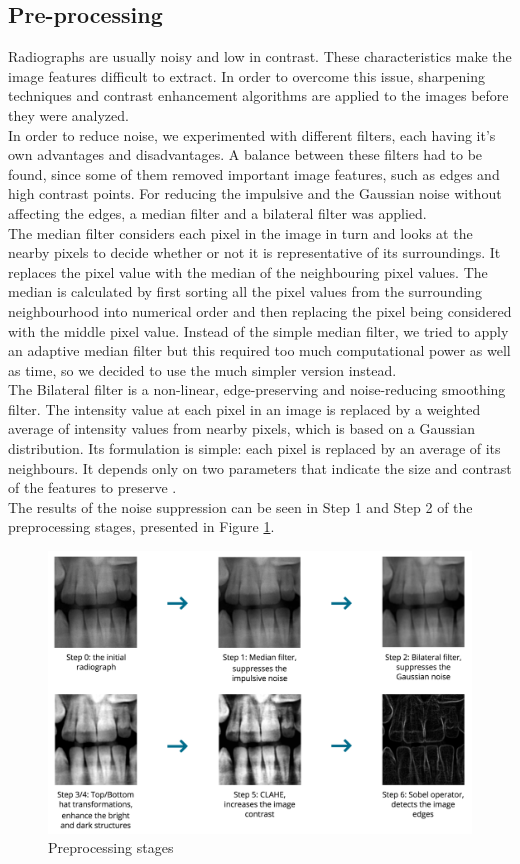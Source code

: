 \documentclass[a4paper]{article}
\begin{document}
\subsection{Pre-processing}
Radiographs are usually noisy and low in contrast. These characteristics make the image features difficult to extract. In order to overcome this issue, sharpening techniques and contrast enhancement algorithms are applied to the images before they were analyzed. \\
In order to reduce noise, we experimented with different filters, each having it's own advantages and disadvantages. A balance between these filters had to be found, since some of them removed important image features, such as edges and high contrast points. For reducing the impulsive and the Gaussian noise without affecting the edges, a median filter and a bilateral filter was applied.\\
The median filter considers each pixel in the image in turn and looks at the nearby pixels to decide whether or not it is representative of its surroundings. It replaces the pixel value with the median of the neighbouring pixel values. The median is calculated by first sorting all the pixel values from the surrounding neighbourhood into numerical order and then replacing the pixel being considered with the middle pixel value.  Instead of the simple median filter, we tried to apply an adaptive median filter but this required too much computational power as well as time, so we decided to use the much simpler version instead. \\
The Bilateral filter is a non-linear, edge-preserving and noise-reducing smoothing filter. The intensity value at each pixel in an image is replaced by a weighted average of intensity values from nearby pixels, which is based on a Gaussian distribution. Its formulation is simple: each pixel is replaced by an average of its neighbours. It depends only on two parameters that indicate the size and contrast of the features to preserve \cite{paris}. \\ 
The results of the noise suppression can be seen in Step 1 and Step 2 of the preprocessing stages, presented in Figure \ref{fig:preproc}. 
\begin{figure}[h] 
    \centering
    \includegraphics[width=12cm]{preprocessing}
    \caption{Preprocessing stages}
    \label{fig:preproc}
\end{figure}
\end{document}
